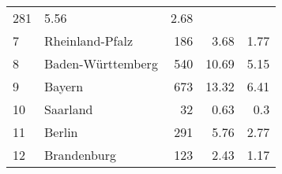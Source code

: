\begin{longtable}{lXrrr}
       \num{281} &
       \num[round-mode=places,round-precision=2]{5,56} &
         \num[round-mode=places,round-precision=2]{2,68} \\

     7 &
     \multicolumn{1}{X}{ Rheinland-Pfalz   } &


       \num{186} &
       \num[round-mode=places,round-precision=2]{3,68} &
         \num[round-mode=places,round-precision=2]{1,77} \\

     8 &
     \multicolumn{1}{X}{ Baden-Württemberg   } &


       \num{540} &
       \num[round-mode=places,round-precision=2]{10,69} &
         \num[round-mode=places,round-precision=2]{5,15} \\

     9 &
     \multicolumn{1}{X}{ Bayern   } &


       \num{673} &
       \num[round-mode=places,round-precision=2]{13,32} &
         \num[round-mode=places,round-precision=2]{6,41} \\

     10 &
     \multicolumn{1}{X}{ Saarland   } &


       \num{32} &
       \num[round-mode=places,round-precision=2]{0,63} &
         \num[round-mode=places,round-precision=2]{0,3} \\

     11 &
     \multicolumn{1}{X}{ Berlin   } &


       \num{291} &
       \num[round-mode=places,round-precision=2]{5,76} &
         \num[round-mode=places,round-precision=2]{2,77} \\

     12 &
     \multicolumn{1}{X}{ Brandenburg   } &


       \num{123} &
       \num[round-mode=places,round-precision=2]{2,43} &
         \num[round-mode=places,round-precision=2]{1,17} \\


\end{longtable}
